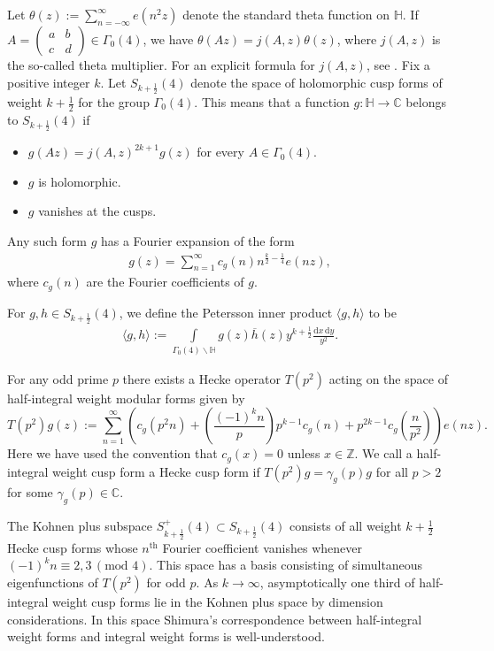 \documentclass[a4paper,10pt,twoside]{amsart}
\theoremstyle{definition}
\numberwithin{equation}{section}
\renewcommand\:{\colon}
\begin{document}
Let $\theta(z):=\sum_{n=-\infty}^\infty e(n^2z)$ denote the standard theta function on $\mathbb H$. If $A=\begin{pmatrix} a & b\\
c & d
\end{pmatrix}\in\Gamma_0(4)$, we have $\theta(Az)=j(A,z)\theta(z)$, where $j(A,z)$ is the so-called theta multiplier. For an explicit formula for $j(A,z)$, see \cite[1.10]{Shimura1973}. Fix a positive integer $k$. Let $S_{k+\frac12}(4)$ denote the space of holomorphic cusp forms of weight $k+\frac12$ for the group $\Gamma_0(4)$. This means that a function $g:\mathbb H\longrightarrow\mathbb C$ belongs to $S_{k+\frac12}(4)$ if 
\begin{itemize}
\item $g(Az)=j(A,z)^{2k+1}g(z)$ for every $A\in\Gamma_0(4)$.
\item $g$ is holomorphic.
\item $g$ vanishes at the cusps. 
\end{itemize} 
Any such form $g$ has a Fourier expansion of the form
\begin{align}\label{Fourier-exp}
g(z)=\sum_{n=1}^\infty c_g(n)n^{\frac k2-\frac14}e(nz),
\end{align}
where $c_g(n)$ are the Fourier coefficients of $g$.

For $g,h\in S_{k+\frac12}(4)$, we define the Petersson inner product $\langle g,h\rangle$ to be
\begin{align}\label{Inner_product}
\langle g,h\rangle:=\int\limits_{\Gamma_0(4)\backslash\mathbb H}g(z)\overline h(z)y^{k+\frac12}\frac{\mathrm d x\,\mathrm d y}{y^2}.
\end{align}

\noindent For any odd prime $p$ there exists a Hecke operator $T(p^2)$ acting on the space of half-integral weight modular forms given by 
\[T(p^2)g(z):=\sum_{n=1}^\infty\left(c_g(p^2n)+\left(\frac{(-1)^k n}p\right)p^{k-1}c_g(n)+p^{2k-1}c_g\left(\frac n{p^2}\right)\right)e(nz).\]
Here we have used the convention that $c_g(x)=0$ unless $x\in\mathbb Z$. We call a half-integral weight cusp form a Hecke cusp form if $T(p^2)g=\gamma_g(p)g$ for all $p>2$ for some $\gamma_g(p)\in\mathbb C$. 

The Kohnen plus subspace $S_{k+\frac12}^+(4)\subset S_{k+\frac12}(4)$ consists of all weight $k+\frac12$ Hecke cusp forms whose $n^{\text{th}}$ Fourier coefficient vanishes whenever $(-1)^k n\equiv 2,3\,(\text{mod }4)$. This space has a basis consisting of simultaneous eigenfunctions of $T(p^2)$ for odd $p$. As $k\longrightarrow\infty$, asymptotically one third of half-integral weight cusp forms lie in the Kohnen plus space by dimension considerations. In this space Shimura's correspondence \cite{Shimura1973} between half-integral weight forms and integral weight forms is well-understood. 
\end{document}
